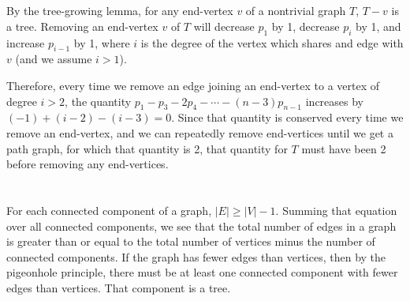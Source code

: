 \documentclass[12pt]{article}
\begin{document}
\section{}
\noindent{}\bigskip\par
By the tree-growing lemma, for any end-vertex $v$ of a nontrivial graph $T$, $T-v$ is a tree. Removing an end-vertex $v$ of $T$ will decrease $p_1$ by 1, decrease $p_i$ by 1, and increase $p_{i-1}$ by 1, where $i$ is the degree of the vertex which shares and edge with $v$ (and we assume $i > 1$).
\par
Therefore, every time we remove an edge joining an end-vertex to a vertex of degree $i>2$, the quantity $p_1 - p_3 - 2p_4 - \cdots - (n-3)p_{n-1}$ increases by $(-1)+(i-2)-(i-3)=0$. Since that quantity is conserved every time we remove an end-vertex, and we can repeatedly remove end-vertices until we get a path graph, for which that quantity is 2, that quantity for $T$ must have been 2 before removing any end-vertices.

\section{}
\noindent{}\bigskip\par
For each connected component of a graph, $|E| \geq |V|-1$. Summing that equation over all connected components, we see that the total number of edges in a graph is greater than or equal to the total number of vertices minus the number of connected components. If the graph has fewer edges than vertices, then by the pigeonhole principle, there must be at least one connected component with fewer edges than vertices. That component is a tree.
\end{document}
